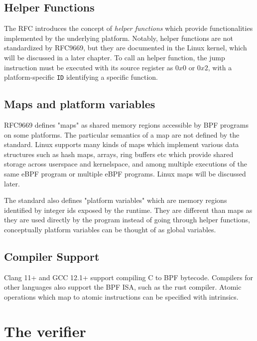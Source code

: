 \subsection*{Helper Functions}

The RFC introduces the concept of \textit{helper functions} which provide
functionalities implemented by the underlying platform. Notably, helper
functions are not standardized by RFC9669, but they are documented in the Linux
kernel, which will be discussed in a later chapter. To call an helper function,
the jump instruction must be executed with its source register as $0x0$ or
$0x2$, with a platform-specific \verb|ID| identifying a specific function.

\subsection*{Maps and platform variables}

RFC9669 defines "maps" as shared memory regions accessible by BPF programs on
some platforms. The particular semantics of a map are not defined by the
standard. Linux supports many kinds of maps which implement various data
structures such as hash maps, arrays, ring buffers etc which provide shared
storage across userspace and kernelspace, and among multiple executions of the
same eBPF program or multiple eBPF programs. Linux maps will be discussed later.

The standard also defines "platform variables" which are memory regions
identified by integer ids exposed by the runtime. They are different than maps
as they are used directly by the program instead of going through helper
functions, conceptually platform variables can be thought of as global
variables.

\subsection*{Compiler Support}

Clang 11+ and GCC 12.1+ support compiling C to BPF bytecode. Compilers for other
languages also support the BPF ISA, such as the rust compiler. Atomic operations
which map to atomic instructions can be specified with intrinsics.

\section{The verifier}


